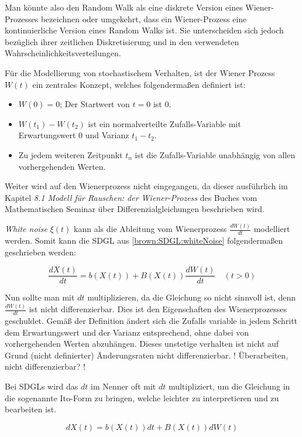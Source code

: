 Man könnte also den Random Walk als eine diskrete Version eines Wiener-Prozesses bezeichnen oder umgekehrt, dass ein Wiener-Prozess eine kontinuierliche Version eines Random Walks ist. Sie unterscheiden sich jedoch bezüglich ihrer zeitlichen Diskretisierung und in den verwendeten Wahrscheinlichkeitsverteilungen.

Für die Modellierung von stochastischem Verhalten, ist der Wiener Prozess $ W(t) $ ein zentrales Konzept, welches folgendermaßen definiert ist:
\begin{itemize}
	\item $ W(0) = 0 $; Der Startwert von $ t = 0 $ ist 0.
	\item $ W(t_{1}) - W(t_{2}) $ ist ein normalverteilte Zufalls-Variable mit Erwartungswert 0 und Varianz $ t_{1} - t_{2} $.
	\item Zu jedem weiteren Zeitpunkt $ t_{n} $ ist die Zufalls-Variable unabhängig von allen vorhergehenden Werten.
\end{itemize}

Weiter wird auf den Wienerprozess nicht eingegangen, da dieser ausführlich im Kapitel \glqq \textit{8.1 Modell für Rauschen: der Wiener-Prozess}\glqq{} des Buches vom Mathematischen Seminar über Differenzialgleichungen beschrieben wird.

\textit{White noise} $ \xi(t) $ kann als die Ableitung vom Wienerprozess $ \frac{dW(t)}{dt} $ modelliert werden. Somit kann die SDGL aus \ref{brown:SDGL:whiteNoise} folgendermaßen geschrieben werden:

\begin{equation}
	\frac{dX(t)}{dt} = b(X(t)) + B(X(t)) \frac{dW(t)}{dt} \quad (t>0)
\end{equation}

Nun sollte man mit $ dt $  multiplizieren, da die Gleichung so nicht sinnvoll ist, denn $ \frac{dW(t)}{dt} $ ist nicht differenzierbar. Dies ist den Eigenschaften des Wienerprozesses geschuldet. Gemäß der Definition ändert sich die Zufalls variable in jedem Schritt dem Erwartungswert und der Varianz entsprechend, ohne dabei von vorhergehenden Werten abzuhängen. Dieses unstetige verhalten ist nicht auf Grund (nicht definierter) Änderungsraten nicht differenzierbar.
! Überarbeiten, nicht differenzierbar? ! 

Bei SDGLs wird das $ dt $ im Nenner oft mit $ dt $ multipliziert, um die Gleichung in die sogenannte \glqq{}Ito-Form\glqq{} zu bringen, welche leichter zu interpretieren und zu bearbeiten ist.

\begin{equation}
	dX(t) = b(X(t)) dt + B(X(t)) dW(t)
\end{equation}

